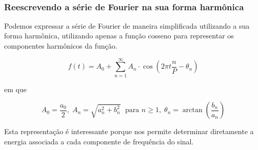 \documentclass[11pt]{article}
\begin{document}
    \begin{center}
    \end{center}
    { \hspace*{\fill} \\}
    
    \hypertarget{reescrevendo-a-suxe9rie-de-fourier-na-sua-forma-harmuxf4nica}{%
\subsubsection{Reescrevendo a série de Fourier na sua forma
harmônica}\label{reescrevendo-a-suxe9rie-de-fourier-na-sua-forma-harmuxf4nica}}

Podemos expressar a série de Fourier de maneira simplificada utilizando
a sua forma harmônica, utilizando apenas a função cosseno para
representar os componentes harmônicos da função.

\[
f(t)=A_{0} + \sum_{n=1}^{\infty} A_{n} \cdot \cos \left(2\pi t \frac{n}{P}-\theta_{n}\right)
\]

em que

\[A_{0}=\frac{a_{0}}{2},\; A_{n}=\sqrt{a_{n}^{2}+b_{n}^{2}} \; \text { para } n \geq 1, \; \theta_{n}=\arctan \left(\frac{b_{n}}{a_{n}}\right)\]

Esta representação é interessante porque nos permite determinar
diretamente a energia associada a cada componente de frequência do
sinal.
\end{document}
